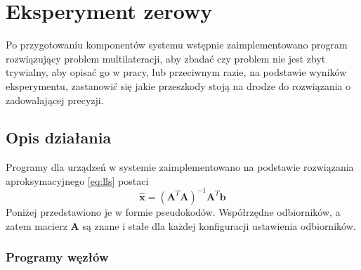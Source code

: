 \chapter{Eksperyment zerowy}\label{chap:experiment_zero}

Po przygotowaniu komponentów systemu wstępnie zaimplementowano program rozwiązujący problem multilateracji, aby zbadać czy problem nie jest zbyt trywialny, aby opisać go w pracy, lub przeciwnym razie, na podstawie wyników eksperymentu, zastanowić się jakie przeszkody stoją na drodze do rozwiązania o zadowalającej precyzji.

\section{Opis działania}

Programy dla urządzeń w systemie zaimplementowano na podstawie rozwiązania aproksymacyjnego \ref{eq:lls} postaci
\begin{equation}
    \hat{\mathbf{x}} = {\left(\mathbf{A}^T\mathbf{A}\right)}^{-1}\mathbf{A}^T\mathbf{b}
\end{equation}
Poniżej przedstawiono je w formie pseudokodów. Współrzędne odbiorników, a zatem macierz $\mathbf{A}$ są znane i stałe dla każdej konfiguracji ustawienia odbiorników.

\subsection{Programy węzłów}

